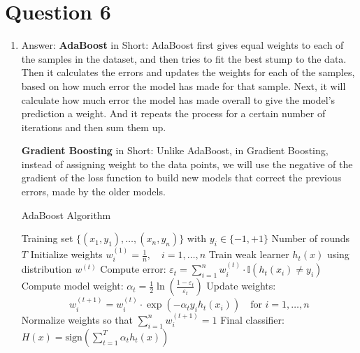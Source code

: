 \documentclass[a4paper,12pt]{article}
\begin{document}
\section*{Question 6}

\begin{enumerate}[label=(\alph*)]
    \item Answer:
    \noindent\textbf{AdaBoost} in Short: AdaBoost first gives equal weights to each of the samples in the dataset, and then tries to fit the best stump to the data. 
    Then it calculates the errors and updates the weights for each of the samples, based on how much error the model has made for that sample. Next, 
    it will calculate how much error the model has made overall to give the model's prediction a weight. And it repeats the process for a certain number of iterations and then sum them up.

    \noindent\textbf{Gradient Boosting} in Short: Unlike AdaBoost, in Gradient Boosting, instead of assigning weight to the data points, we will use the negative of the gradient of the loss function to 
    build new models that correct the previous errors, made by the older models. 

    \begin{algorithm}
    \caption{AdaBoost Algorithm}
    \begin{algorithmic}[1]
    \REQUIRE Training set $\{(x_1, y_1), \dots, (x_n, y_n)\}$ with $y_i \in \{-1, +1\}$
    \REQUIRE Number of rounds $T$
    \STATE Initialize weights $w_i^{(1)} = \frac{1}{n}, \quad i = 1, \dots, n$
        \STATE Train weak learner $h_t(x)$ using distribution $w^{(t)}$
        \STATE Compute error: $\varepsilon_t = \sum_{i=1}^n w_i^{(t)} \cdot \mathbb{I}(h_t(x_i) \ne y_i)$
        \STATE Compute model weight: $\alpha_t = \frac{1}{2} \ln\left(\frac{1 - \varepsilon_t}{\varepsilon_t}\right)$
        \STATE Update weights:
        \[
            w_i^{(t+1)} = w_i^{(t)} \cdot \exp(-\alpha_t y_i h_t(x_i)) \quad \text{for } i = 1, \dots, n
        \]
        \STATE Normalize weights so that $\sum_{i=1}^n w_i^{(t+1)} = 1$
    \ENDFOR
    \RETURN Final classifier: $H(x) = \text{sign} \left( \sum_{t=1}^T \alpha_t h_t(x) \right)$
    \end{algorithmic}
    \end{algorithm}


\end{enumerate}
\end{document}
